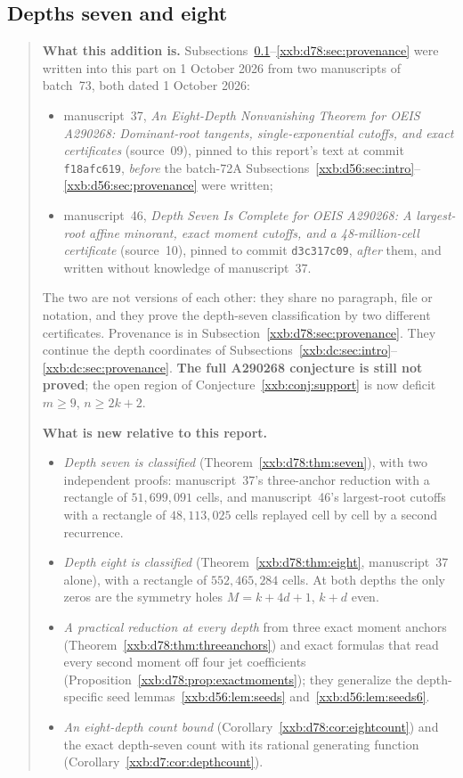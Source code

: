 \documentclass[11pt,a4paper]{article}
\numberwithin{equation}{section}
\theoremstyle{definition}
\theoremstyle{remark}
\theoremstyle{plain}
\begin{document}
\subsection{Depths seven and eight}\label{xxb:d78:sec:intro}

\begin{quote}\small
\textbf{What this addition is.}
Subsections~\ref{xxb:d78:sec:intro}--\ref{xxb:d78:sec:provenance} were
written into this part on 1 October 2026 from two manuscripts of batch~73,
both dated 1 October 2026:
\begin{itemize}[leftmargin=1.4em,itemsep=1pt]
\item manuscript~37, \emph{An Eight-Depth Nonvanishing Theorem for OEIS
 A290268: Dominant-root tangents, single-exponential cutoffs, and exact
 certificates} (source~09), pinned to this report's text at commit
 \texttt{f18afc619}, \emph{before} the batch-72A
 Subsections~\ref{xxb:d56:sec:intro}--\ref{xxb:d56:sec:provenance} were
 written;
\item manuscript~46, \emph{Depth Seven Is Complete for OEIS A290268: A
 largest-root affine minorant, exact moment cutoffs, and a
 48-million-cell certificate} (source~10), pinned to commit
 \texttt{d3c317c09}, \emph{after} them, and written without knowledge of
 manuscript~37.
\end{itemize}
The two are not versions of each other: they share no paragraph, file or
notation, and they prove the depth-seven classification by two different
certificates.  Provenance is in Subsection~\ref{xxb:d78:sec:provenance}.
They continue the depth coordinates of
Subsections~\ref{xxb:dc:sec:intro}--\ref{xxb:dc:sec:provenance}.
\textbf{The full A290268 conjecture is still not proved}; the open region of
Conjecture~\ref{xxb:conj:support} is now deficit $m\ge9$, $n\ge2k+2$.

\smallskip
\textbf{What is new relative to this report.}
\begin{itemize}[leftmargin=1.4em,itemsep=1pt]
\item \emph{Depth seven is classified} (Theorem~\ref{xxb:d78:thm:seven}), with
 two independent proofs: manuscript~37's three-anchor reduction with a
 rectangle of $51{,}699{,}091$ cells, and manuscript~46's largest-root
 cutoffs with a rectangle of $48{,}113{,}025$ cells replayed cell by cell by a
 second recurrence.
\item \emph{Depth eight is classified} (Theorem~\ref{xxb:d78:thm:eight},
 manuscript~37 alone), with a rectangle of $552{,}465{,}284$ cells.  At both
 depths the only zeros are the symmetry holes $M=k+4d+1$, $k+d$ even.
\item \emph{A practical reduction at every depth} from three exact moment
 anchors (Theorem~\ref{xxb:d78:thm:threeanchors}) and exact formulas that
 read every second moment off four jet coefficients
 (Proposition~\ref{xxb:d78:prop:exactmoments}); they generalize the
 depth-specific seed lemmas~\ref{xxb:d56:lem:seeds}
 and~\ref{xxb:d56:lem:seeds6}.
\item \emph{An eight-depth count bound} (Corollary~\ref{xxb:d78:cor:eightcount})
 and the exact depth-seven count with its rational generating function
 (Corollary~\ref{xxb:d7:cor:depthcount}).
\end{itemize}


\end{quote}
\end{document}
